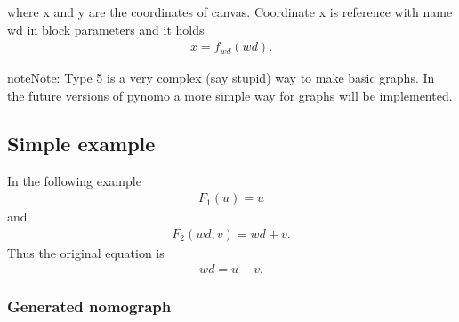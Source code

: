 \documentclass[a4paper,11pt,english]{sphinxmanual}
\begin{document}
where x and y are the coordinates of canvas. Coordinate x is reference with name wd in block parameters and it holds
\begin{equation*}
\begin{split}x = f_{wd}(wd).\end{split}
\end{equation*}
\begin{sphinxadmonition}{note}{Note:}
Type 5 is a very complex (say stupid) way to make basic graphs. In the future versions of pynomo a more simple way for graphs will be implemented.
\end{sphinxadmonition}


\subsection{Simple example}
\label{\detokenize{types/types:id17}}
In the following example
\begin{equation*}
\begin{split}F_1(u)=u\end{split}
\end{equation*}
and
\begin{equation*}
\begin{split}F_2(wd,v)=wd+v.\end{split}
\end{equation*}
Thus the original equation is
\begin{equation*}
\begin{split}wd=u-v.\end{split}
\end{equation*}

\subsubsection{Generated nomograph}
\label{\detokenize{types/types:id18}}
\noindent{}
\end{document}
